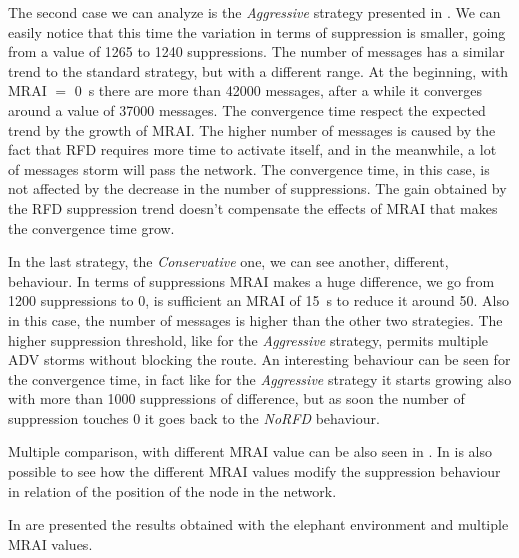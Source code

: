 The second case we can analyze is the \textit{Aggressive} strategy presented
in .
We can easily notice that this time the variation in terms of suppression is smaller,
going from a value of \num{1265} to \num{1240} suppressions.
The number of messages has a similar trend to the standard strategy, but with
a different range.
At the beginning, with \ac{MRAI} $=$ \SI{0}{\second} there are more than \num{42000}
messages, after a while it converges around a value of \num{37000} messages.
The convergence time respect the expected trend by the growth of \ac{MRAI}.
The higher number of messages is caused by the fact that \ac{RFD} requires more time
to activate itself, and in the meanwhile, a lot of messages storm will pass the
network.
The convergence time, in this case, is not affected by the decrease in the number
of suppressions.
The gain obtained by the \ac{RFD} suppression trend doesn't compensate the
effects of \ac{MRAI} that makes the convergence time grow.

In the last strategy, the \textit{Conservative} one, we can see another, different,
behaviour.
In terms of suppressions \ac{MRAI} makes a huge difference, we go from \num{1200}
suppressions to \num{0}, is sufficient an \ac{MRAI} of \SI{15}{\second} to reduce
it around \num{50}.
Also in this case, the number of messages is higher than the other two strategies.
The higher suppression threshold, like for the \textit{Aggressive} strategy, permits
multiple \ac{ADV} storms without blocking the route.
An interesting behaviour can be seen for the convergence time, in fact like for
the \textit{Aggressive} strategy it starts growing also with more than \num{1000}
suppressions of difference, but as soon the number of suppression touches \num{0}
it goes back to the \textit{NoRFD} behaviour.

Multiple comparison, with different \ac{MRAI} value can be also seen in
.
In  is also possible to see how the different
\ac{MRAI} values modify the suppression behaviour in relation of the position of
the node in the network.

In  are presented the results obtained
with the elephant environment and multiple \ac{MRAI} values.

